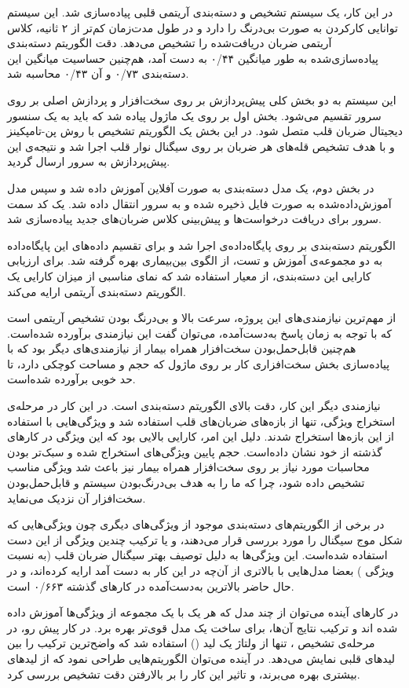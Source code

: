  
\label{chap:conclusion}
\pagebreak
در این کار، یک سیستم تشخیص و دسته‌بندی آریتمی قلبی پیاده‌سازی شد. این سیستم توانایی کارکردن به صورت بی‌درنگ را دارد و در طول مدت‌زمان کم‌تر از ۲ ثانیه، کلاس آریتمی ضربان دریافت‌شده را تشخیص می‌دهد. دقت الگوریتم دسته‌بندی پیاده‌سازی‌شده به طور میانگین ۰/۴۴ به دست آمد، هم‌چنین حساسیت میانگین این دسته‌بندی ۰/۷۳ و   آن ۰/۴۳ محاسبه شد. 

این سیستم به دو بخش کلی پیش‌پردازش بر روی سخت‌افزار و پردازش اصلی بر روی سرور تقسیم می‌شود. بخش اول بر روی یک ماژول  پیاده شد که باید به یک سنسور دیجیتال ضربان قلب متصل شود. در این بخش یک الگوریتم تشخیص  با روش پن-تامپکینز و با هدف تشخیص قله‌های  هر ضربان بر روی سیگنال نوار قلب اجرا شد و نتیجه‌ی این پیش‌پردازش به سرور ارسال گردید.

در بخش دوم، یک مدل دسته‌بندی  به صورت آفلاین آموزش داده شد و سپس مدل آموزش‌داده‌شده به صورت فایل ذخیره شده و به سرور انتقال داده شد. یک کد سمت سرور برای دریافت درخواست‌ها و پیش‌بینی کلاس ضربان‌‌های جدید پیاده‌سازی شد.

الگوریتم دسته‌بندی بر روی پایگاه‌داده‌ی  اجرا شد و برای تقسیم داده‌های این پایگاه‌داده به دو مجموعه‌ی آموزش و تست، از الگوی بین‌بیماری بهره گرفته شد. برای ارزیابی کارایی این دسته‌بندی، از معیار   استفاده شد که نمای مناسبی از میزان کارایی یک الگوریتم دسته‌بندی آریتمی ارایه می‌کند.

از مهم‌ترین نیازمندی‌های این پروژه، سرعت بالا و بی‌درنگ بودن تشخیص آریتمی است که با توجه به زمان پاسخ به‌دست‌آمده، می‌توان گفت این نیازمندی برآورده شده‌است. هم‌چنین قابل‌حمل‌بودن سخت‌افزار همراه بیمار  از نیازمندی‌های دیگر بود که با پیاده‌سازی بخش سخت‌افزاری کار بر روی ماژول  که حجم و مساحت کوچکی دارد، تا حد خوبی برآورده شده‌است.

نیازمندی دیگر این کار، دقت بالای الگوریتم دسته‌بندی است. در این کار در مرحله‌ی استخراج ویژگی، تنها از بازه‌های  ضربان‌های قلب استفاده شد و ویژگی‌هایی با استفاده از این بازه‌ها استخراج شدند. دلیل این امر، کارایی بالایی بود که این ویژگی‌ در کارهای گذشته از خود نشان داده‌است. حجم پایین ویژگی‌های استخراج شده و سبک‌تر بودن محاسبات مورد نیاز بر روی سخت‌افزار همراه بیمار  نیز باعث شد ویژگی  مناسب تشخیص داده شود، چرا که ما را به هدف بی‌درنگ‌بودن سیستم و قابل‌حمل‌بودن سخت‌افزار آن نزدیک می‌نماید.

در برخی از الگوریتم‌های دسته‌بندی موجود از ویژگی‌های دیگری چون ویژگی‌هایی که شکل موج سیگنال را مورد بررسی قرار می‌دهند، و یا ترکیب چندین ویژگی از این دست استفاده شده‌است. این ویژگی‌ها به دلیل توصیف بهتر سیگنال ضربان قلب (به نسبت ویژگی ) بعضا مدل‌هایی با   بالاتری از آن‌چه در این کار به دست آمد ارایه کرده‌اند، و در حال حاضر بالاترین   به‌دست‌آمده در کارهای گذشته ۰/۶۶۳ است.

در کارهای آینده می‌توان از چند مدل  که هر یک با یک مجموعه از ویژگی‌ها آموزش داده شده اند و ترکیب نتایج آن‌ها، برای ساخت یک مدل  قوی‌تر بهره برد. در کار پیش رو، در مرحله‌ی تشخیص ، تنها از ولتاژ یک لید () استفاده شد که واضح‌ترین ترکیب  را بین لیدهای قلبی نمایش می‌دهد. در آینده می‌توان الگوریتم‌هایی طراحی نمود که از  لیدهای بیشتری بهره می‌برند، و تاثیر این کار را بر بالارفتن دقت تشخیص  بررسی کرد.
